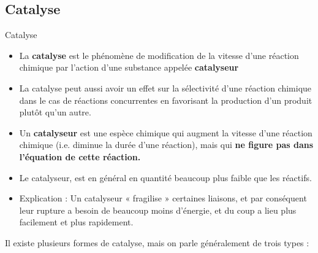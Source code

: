 \documentclass[11pt,a4paper]{article}
\begin{document}
\subsection{Catalyse}

\begin{defn}{Catalyse}
\begin{itemize}
    \item La \textbf{catalyse} est le phénomène de modification de la vitesse d'une réaction chimique par l'action d'une substance appelée \textbf{catalyseur}
    \item La catalyse peut aussi avoir un effet sur la sélectivité d'une réaction chimique dans le cas de réactions concurrentes en favorisant la production d'un produit plutôt qu'un autre. 
    \item Un \textbf{catalyseur}  est une espèce chimique qui augment la vitesse d’une réaction chimique (i.e. diminue la durée d’une réaction), mais qui \textbf{ne figure pas dans l’équation de cette réaction.}
    \item Le catalyseur, est en général en quantité beaucoup plus faible que les réactifs. 
    \item Explication : Un catalyseur « fragilise » certaines liaisons, et par conséquent leur rupture a besoin de beaucoup moins d’énergie, et du coup a lieu plus facilement et plus rapidement.
\end{itemize}
\end{defn}

Il existe plusieurs formes de catalyse, mais on parle généralement de trois types : 
\end{document}
